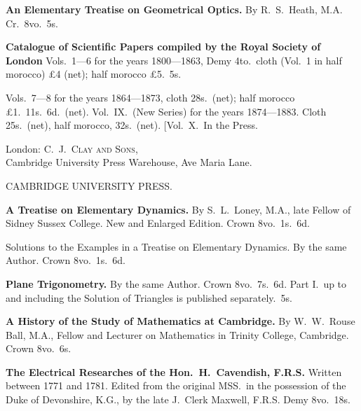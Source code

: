 \documentclass[11pt,a4paper]{article}
\theoremstyle{plain}
\theoremstyle{definition}
\theoremstyle{remark}
\begin{document}
\smallskip

\noindent\textbf{An Elementary Treatise on Geometrical Optics.} By R.\ S.\ Heath, M.A. Cr.\ 8vo.\ 5s.

\smallskip

\noindent\textbf{Catalogue of Scientific Papers compiled by the Royal Society of London} Vols.\ 1---6 for the years 1800---1863, Demy 4to.\ cloth (Vol.\ 1 in half morocco) \pounds4 (net); half morocco \pounds5.\ 5s.

\smallskip

\noindent Vols.\ 7---8 for the years 1864---1873, cloth 28s.\ (net); half morocco \pounds1.\ 11s.\ 6d.\ (net). Vol.\ IX.\ (New Series) for the years 1874---1883. Cloth 25s.\ (net), half morocco, 32s.\ (net). [Vol.\ X.\ In the Press.

\begin{flushright}
London: C.\ J.\ \textsc{Clay and Sons},\\
Cambridge University Press Warehouse, Ave Maria Lane.
\end{flushright}

\newpage
\setcounter{page}{632}

\begin{center}
\large CAMBRIDGE UNIVERSITY PRESS.
\end{center}

\smallskip

\noindent\textbf{A Treatise on Elementary Dynamics.} By S.\ L.\ Loney, M.A., late Fellow of Sidney Sussex College. New and Enlarged Edition. Crown 8vo.\ 1s.\ 6d.

\smallskip

Solutions to the Examples in a Treatise on Elementary Dynamics. By the same Author. Crown 8vo.\ 1s.\ 6d.

\smallskip

\noindent\textbf{Plane Trigonometry.} By the same Author. Crown 8vo.\ 7s.\ 6d. Part I.\ up to and including the Solution of Triangles is published separately.\ 5s.

\smallskip

\noindent\textbf{A History of the Study of Mathematics at Cambridge.} By W.\ W.\ Rouse Ball, M.A., Fellow and Lecturer on Mathematics in Trinity College, Cambridge. Crown 8vo.\ 6s.

\smallskip

\noindent\textbf{The Electrical Researches of the Hon.\ H.\ Cavendish, F.R.S.} Written between 1771 and 1781. Edited from the original MSS.\ in the possession of the Duke of Devonshire, K.G., by the late J.\ Clerk Maxwell, F.R.S. Demy 8vo.\ 18s.
\end{document}
